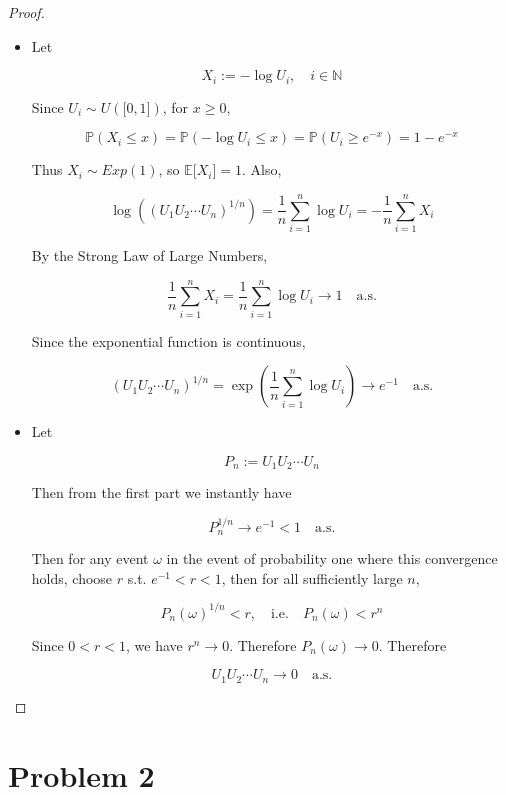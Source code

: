 \documentclass{qlnotes-export}
\begin{document}
\begin{proof}

\begin{itemize}
\item
  Let

  \[X_{i} := - \log U_{i},\quad i \in {\mathbb{N}}\]

  Since \(U_{i} \sim U(\lbrack 0,1\rbrack)\), for \(x \geq 0\),

  \[{\mathbb{P}}(X_{i} \leq x) = {\mathbb{P}}( - \log U_{i} \leq x) = {\mathbb{P}}(U_{i} \geq e^{- x}) = 1 - e^{- x}\]

  Thus \(X_{i} \sim Exp(1)\), so \({\mathbb{E}}\lbrack X_{i}\rbrack = 1\). Also,

  \[\log\left( {(U_{1}U_{2}\cdots U_{n})^{1/n}} \right) = \frac{1}{n}\sum\limits_{i = 1}^{n}\log U_{i} = - \frac{1}{n}\sum\limits_{i = 1}^{n}X_{i}\]

  By the Strong Law of Large Numbers,

  \[\frac{1}{n}\sum\limits_{i = 1}^{n}X_{i} = \frac{1}{n}\sum\limits_{i = 1}^{n}\log U_{i}\rightarrow 1\quad\text{a.s.}\]

  Since the exponential function is continuous,

  \[(U_{1}U_{2}\cdots U_{n})^{1/n} = \exp\left( {\frac{1}{n}\sum\limits_{i = 1}^{n}\log U_{i}} \right)\rightarrow e^{- 1}\quad\text{a.s.}\]
\item
  Let

  \[P_{n} := U_{1}U_{2}\cdots U_{n}\]

  Then from the first part we instantly have

  \[P_{n}^{1/n}\rightarrow e^{- 1} < 1\quad\text{a.s.}\]

  Then for any event \(\omega\) in the event of probability one where this convergence holds, choose \(r\) s.t. \(e^{- 1} < r < 1\), then for all sufficiently large \(n\),

  \[P_{n}(\omega)^{1/n} < r,\quad\text{i.e.}\quad P_{n}(\omega) < r^{n}\]

  Since \(0 < r < 1\), we have \(r^{n}\rightarrow 0\). Therefore \(P_{n}(\omega)\rightarrow 0\). Therefore

  \[U_{1}U_{2}\cdots U_{n}\rightarrow 0\quad\text{a.s.}\]
\end{itemize}

\end{proof}

\section{Problem 2}\label{problem-2-5}
\end{document}
